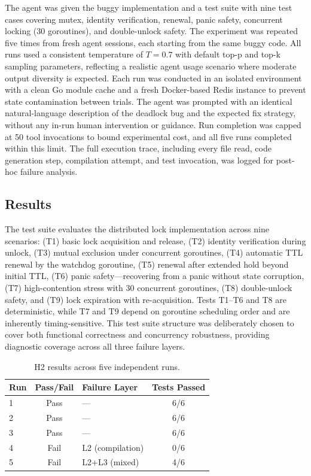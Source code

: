 \documentclass[conference]{IEEEtran}
\begin{document}
The agent was given the buggy implementation and a test suite with nine test cases covering mutex, identity verification, renewal, panic safety, concurrent locking (30 goroutines), and double-unlock safety.
The experiment was repeated five times from fresh agent sessions, each starting from the same buggy code.
All runs used a consistent temperature of $T = 0.7$ with default top-p and top-k sampling parameters, reflecting a realistic agent usage scenario where moderate output diversity is expected.
Each run was conducted in an isolated environment with a clean Go module cache and a fresh Docker-based Redis instance to prevent state contamination between trials.
The agent was prompted with an identical natural-language description of the deadlock bug and the expected fix strategy, without any in-run human intervention or guidance.
Run completion was capped at 50 tool invocations to bound experimental cost, and all five runs completed within this limit.
The full execution trace, including every file read, code generation step, compilation attempt, and test invocation, was logged for post-hoc failure analysis.

\subsection{Results}

The test suite evaluates the distributed lock implementation across nine scenarios: (T1) basic lock acquisition and release, (T2) identity verification during unlock, (T3) mutual exclusion under concurrent goroutines, (T4) automatic TTL renewal by the watchdog goroutine, (T5) renewal after extended hold beyond initial TTL, (T6) panic safety---recovering from a panic without state corruption, (T7) high-contention stress with 30 concurrent goroutines, (T8) double-unlock safety, and (T9) lock expiration with re-acquisition.
Tests T1--T6 and T8 are deterministic, while T7 and T9 depend on goroutine scheduling order and are inherently timing-sensitive.
This test suite structure was deliberately chosen to cover both functional correctness and concurrency robustness, providing diagnostic coverage across all three failure layers.

\begin{table}[h]
\centering
\caption{H2 results across five independent runs.}
\label{tab:h2}
\begin{tabular}{lclc}
\toprule
Run & Pass/Fail & Failure Layer & Tests Passed \\
\midrule
1 & Pass & --- & 6/6 \\
2 & Pass & --- & 6/6 \\
3 & Pass & --- & 6/6 \\
4 & Fail & L2 (compilation) & 0/6 \\
5 & Fail & L2+L3 (mixed) & 4/6 \\
\bottomrule
\end{tabular}
\end{table}
\end{document}

